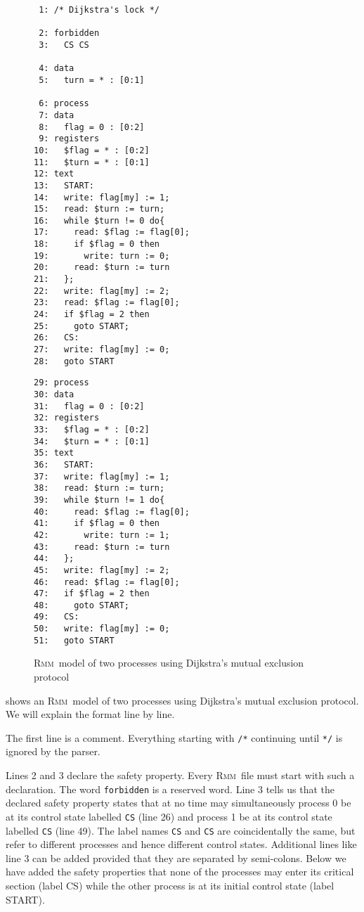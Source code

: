 \documentclass[a4paper]{article}
\newcommand{\rmm}{\textsc{Rmm}}
\begin{document}
\begin{figure}[ht]
\begin{minipage}[b]{0.5\linewidth}
\small{
\begin{verbatim}
 1: /* Dijkstra's lock */

 2: forbidden
 3:   CS CS

 4: data
 5:   turn = * : [0:1]

 6: process
 7: data
 8:   flag = 0 : [0:2]
 9: registers
10:   $flag = * : [0:2]
11:   $turn = * : [0:1]
12: text
13:   START:
14:   write: flag[my] := 1;
15:   read: $turn := turn;
16:   while $turn != 0 do{
17:     read: $flag := flag[0];
18:     if $flag = 0 then
19:       write: turn := 0;
20:     read: $turn := turn
21:   };
22:   write: flag[my] := 2;
23:   read: $flag := flag[0];
24:   if $flag = 2 then
25:     goto START;
26:   CS:
27:   write: flag[my] := 0;
28:   goto START
\end{verbatim}
}
\end{minipage}
\hspace{0pt}
\begin{minipage}[b]{0.45\linewidth}
\small{
\begin{verbatim}
29: process
30: data
31:   flag = 0 : [0:2]
32: registers
33:   $flag = * : [0:2]
34:   $turn = * : [0:1]
35: text
36:   START:
37:   write: flag[my] := 1;
38:   read: $turn := turn;
39:   while $turn != 1 do{
40:     read: $flag := flag[0];
41:     if $flag = 0 then
42:       write: turn := 1;
43:     read: $turn := turn
44:   };
45:   write: flag[my] := 2;
46:   read: $flag := flag[0];
47:   if $flag = 2 then
48:     goto START;
49:   CS:
50:   write: flag[my] := 0;
51:   goto START
\end{verbatim}
}
\end{minipage}
\caption{\rmm\ model of two processes using Dijkstra's mutual exclusion protocol\cite{LP93}}\label{fig:code:dijkstra.rmm}
\end{figure}

 shows an \rmm\ model of two processes using
Dijkstra's mutual exclusion protocol. We will explain the format line
by line.

The first line is a comment. Everything starting with \verb+/*+
continuing until \verb+*/+ is ignored by the parser.

Lines 2 and 3 declare the safety property. Every \rmm\ file must start
with such a declaration. The word \verb+forbidden+ is a reserved
word. Line 3 tells us that the declared safety property states that at
no time may simultaneously process 0 be at its control state labelled
\verb+CS+ (line 26) and process 1 be at its control state labelled
\verb+CS+ (line 49). The label names \verb+CS+ and \verb+CS+ are
coincidentally the same, but refer to different processes and hence
different control states. Additional lines like line 3 can be added
provided that they are separated by semi-colons. Below we have added
the safety properties that none of the processes may enter its
critical section (label CS) while the other process is at its initial
control state (label START).
\end{document}

